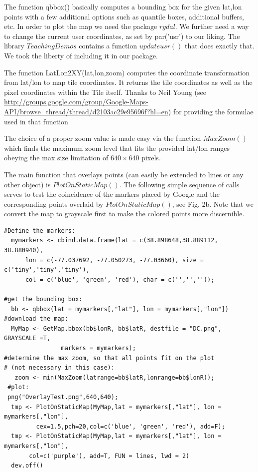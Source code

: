 \documentclass{article}
\begin{document}
\noindent The function qbbox() basically computes a bounding box for the given lat,lon points with a few additional options such as quantile boxes, additional buffers, etc.
In order to plot the map we need the package $rgdal$.
We further need a way to change the current user coordinates, as set by par('usr') to our liking. The library $TeachingDemos$ contains a function $updateusr()$ that does exactly that. We took the liberty of including it in our package.

\noindent The function LatLon2XY(lat,lon,zoom) computes the coordinate transformation from lat/lon to map tile coordinates. 
It returns the tile coordinates as well as the pixel coordinates within the Tile itself.
Thanks to Neil Young (see \url{http://groups.google.com/group/Google-Maps-API/browse_thread/thread/d2103ac29e95696f?hl=en}) for providing the formulae used in that function

\noindent The choice of a proper zoom value is made easy via the function $MaxZoom()$ which finds the maximum zoom level that fits the provided lat/lon ranges obeying the max size limitation of $640 \times 640$ pixels.

\noindent The main function that overlays points (can easily be extended to lines or any other object) is $PlotOnStaticMap()$.
The following simple sequence of calls serves to test the coincidence of the markers placed by Google and the corresponding points overlaid by $PlotOnStaticMap()$, see Fig. 2b. Note that we convert the map to grayscale first to make the colored points more discernible.
\begin{verbatim}
#Define the markers:
  mymarkers <- cbind.data.frame(lat = c(38.898648,38.889112, 38.880940), 
      lon = c(-77.037692, -77.050273, -77.03660), size =  c('tiny','tiny','tiny'), 
      col = c('blue', 'green', 'red'), char = c('','',''));

#get the bounding box:
  bb <- qbbox(lat = mymarkers[,"lat"], lon = mymarkers[,"lon"])
#download the map:
  MyMap <- GetMap.bbox(bb$lonR, bb$latR, destfile = "DC.png", GRAYSCALE =T,
                markers = mymarkers);
#determine the max zoom, so that all points fit on the plot
# (not necessary in this case):  
   zoom <- min(MaxZoom(latrange=bb$latR,lonrange=bb$lonR));
 #plot:
 png("OverlayTest.png",640,640);
  tmp <- PlotOnStaticMap(MyMap,lat = mymarkers[,"lat"], lon = mymarkers[,"lon"], 
         cex=1.5,pch=20,col=c('blue', 'green', 'red'), add=F);
  tmp <- PlotOnStaticMap(MyMap,lat = mymarkers[,"lat"], lon = mymarkers[,"lon"], 
       col=c('purple'), add=T, FUN = lines, lwd = 2)
  dev.off()
\end{verbatim}
\end{document}
